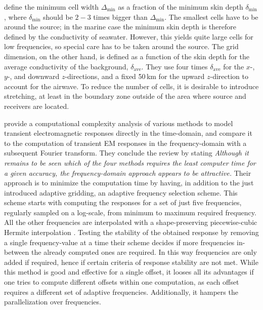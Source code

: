 \documentclass[
    manuscript,
  ]{geophysics}
\begin{document}
\cite{GEO.07.Plessix} define the minimum cell width $\Delta_\mathrm{min}$ as a
fraction of the minimum skin depth $\delta_\mathrm{min}$, where
$\delta_\mathrm{min}$ should be $2-3$ times bigger than $\Delta_\mathrm{min}$.
The smallest cells have to be around the source; in the marine case the minimum
skin depth is therefore defined by the conductivity of seawater. However, this
yields quite large cells for low frequencies, so special care has to be taken
around the source. The grid dimension, on the other hand, is defined as a
function of the skin depth for the average conductivity of the background,
$\delta_\mathrm{ave}$. They use four times $\delta_\mathrm{ave}$ for the $x$-,
$y$-, and downward $z$-directions, and a fixed 50\,km for the upward
$z$-direction to account for the airwave. To reduce the number of cells, it is
desirable to introduce stretching, at least in the boundary zone outside of the
area where source and receivers are located.

\cite{GEO.08.Mulder} provide a computational complexity analysis of various
methods to model transient electromagnetic responses directly in the
time-domain, and compare it to the computation of transient EM responses in the
frequency-domain with a subsequent Fourier transform. They conclude the review
by stating \emph{\guillemotleft Although it remains to be seen which of the
four methods requires the least computer time for a given accuracy, the
frequency-domain approach appears to be attractive.\guillemotright} Their
approach is to minimize the computation time by having, in addition to the just
introduced adaptive gridding, an adaptive frequency selection scheme. This
scheme starts with computing the responses for a set of just five frequencies,
regularly sampled on a log-scale, from minimum to maximum required frequency.
All the other frequencies are interpolated with a shape-preserving
piecewise-cubic Hermite interpolation \citep[PCHIP, ][]{SIAM.80.Fritsch}.
Testing the stability of the obtained response by removing a single
frequency-value at a time their scheme decides if more frequencies in-between
the already computed ones are required. In this way frequencies are only added
if required, hence if certain criteria of response stability are not met. While
this method is good and effective for a single offset, it looses all its
advantages if one tries to compute different offsets within one computation, as
each offset requires a different set of adaptive frequencies. Additionally, it
hampers the parallelization over frequencies.
\end{document}
